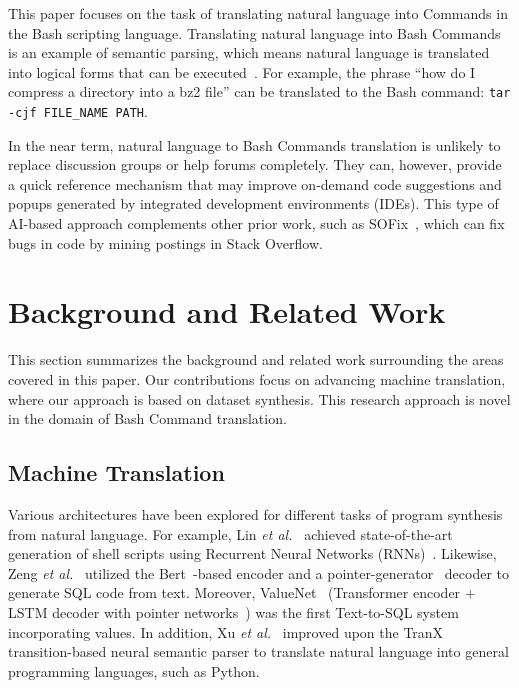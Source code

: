 \documentclass{river-journal}
\begin{document}
This paper focuses on the task of translating natural language into Commands in the Bash scripting language. Translating natural language into Bash Commands is an example of semantic parsing, which means natural language is translated into logical forms that can be executed~\cite{Berant2013SemanticPO}. For example, the phrase ``how do I compress a directory into a bz2 file'' can be translated to the Bash command: \texttt{tar -cjf FILE\_NAME PATH}.

In the near term, natural language to Bash Commands translation is unlikely to replace discussion groups or help forums completely. They can, however, provide a quick reference mechanism that may improve on-demand code suggestions and popups generated by integrated development environments (IDEs). This type of AI-based approach complements other prior work, such as SOFix~\cite{Liu2018MiningSF}, which can fix bugs in code by mining postings in Stack Overflow. 

\section{Background and Related Work}
\label{background}
This section summarizes the background and related work surrounding the areas covered in this paper. Our contributions focus on advancing machine translation, where our approach is based on dataset synthesis. This research approach is novel in the domain of Bash Command translation.

\subsection{\bf Machine Translation}

Various architectures have been explored for different tasks of program synthesis from natural language. For example, Lin \textit{et al.}~\cite{Lin2017ProgramSF} achieved state-of-the-art generation of shell scripts using Recurrent Neural Networks (RNNs)~\cite{Mikolov2010RecurrentNN}. Likewise, Zeng \textit{et al.}~\cite{Zeng2020PhotonAR} utilized the Bert~\cite{Devlin2019BERTPO}-based encoder and a pointer-generator~\cite{See2017GetTT} decoder to generate SQL code from text. Moreover, ValueNet~\cite{Brunner2020ValueNetAN} (Transformer encoder + LSTM decoder with pointer networks~\cite{Vinyals2015PointerN}) was the first Text-to-SQL system incorporating values. In addition, Xu \textit{et al.}~\cite{Xu2020IncorporatingEK} improved upon the TranX~\cite{Yin2018TRANXAT} transition-based neural semantic parser to translate natural language into general programming languages, such as Python. 
\end{document}
